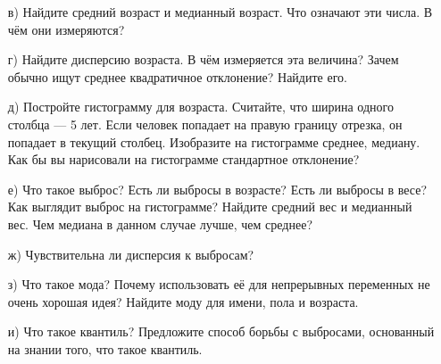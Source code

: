 \documentclass[12pt, a4paper, oneside]{article}
\theoremstyle{plain} %
\theoremstyle{definition}
\newcounter{problem}%
\renewcommand{\theproblem}{\arabic{problem}}
\newenvironment{problem}{
\addtocounter{problem}{1}\noindent{ \color{titleblue} \large \bfseries Упражнение~\theproblem \vspace{1ex} \newline}
}{ }
\begin{document}
\begin{problem}
\begin{enumerate}
	\item[в)] Найдите средний возраст и медианный возраст.  Что означают эти числа. В чём они измеряются? 

	\item[г)] Найдите дисперсию возраста. В чём измеряется эта величина? Зачем обычно ищут среднее квадратичное отклонение? Найдите его. 	
	
	\item[д)]  Постройте гистограмму для возраста. Считайте, что ширина одного столбца --- 5 лет. Если человек попадает на правую границу отрезка, он попадает в текущий столбец.  Изобразите на гистограмме среднее, медиану. Как бы вы нарисовали на гистограмме стандартное отклонение? 
	
	\item[е)] Что такое выброс? Есть ли выбросы в возрасте? Есть ли выбросы в весе? Как выглядит выброс на гистограмме? Найдите средний вес и медианный вес. Чем медиана в данном случае лучше, чем среднее?
	
	\item[ж)] Чувствительна ли дисперсия к выбросам?
	
	\item[з)] Что такое мода? Почему использовать её для непрерывных переменных не очень хорошая идея? Найдите моду для имени, пола и возраста.
	
	\item[и)]  Что такое квантиль? Предложите способ  борьбы с выбросами, основанный на знании того, что такое квантиль.
\end{enumerate}
\end{problem}
\end{document}
